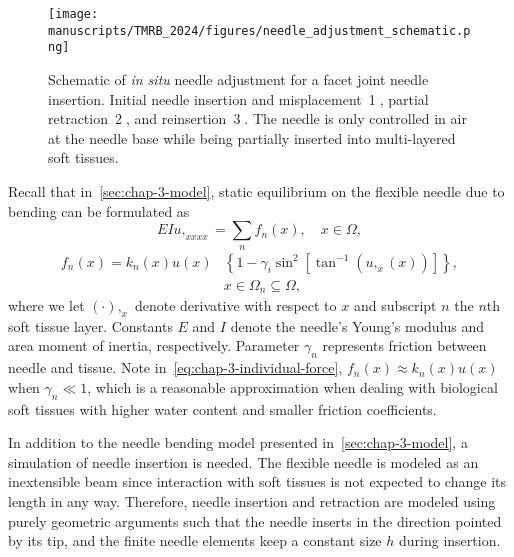\begin{figure}[t]
  \centering
  \texttt{[image: manuscripts/TMRB\_2024/figures/needle\_adjustment\_schematic.png]}
  \caption{Schematic of \textit{in situ} needle adjustment for a facet joint needle insertion. Initial needle insertion and misplacement~\textcircled{1}, partial retraction~\textcircled{2}, and reinsertion~\textcircled{3}. The needle is only controlled in air at the needle base while being partially inserted into multi-layered soft tissues.}
  \label{fig:chap-3-needle-adjustment-schematic}
\end{figure}

Recall that in~\cref{sec:chap-3-model}, static equilibrium on the flexible needle due to bending can be formulated as
\begin{equation}
  EIu,_{xxxx} = \sum_{n}f_n(x), \quad x\in\Omega,
\end{equation}
\begin{equation}
  \begin{aligned}
      \label{eq:chap-3-individual-force}
    f_n(x) = k_n(x)u(x)&\left\{1 - \gamma_i\sin^2\left[ \tan^{-1} \left( u,_x(x) \right) \right] \right\}, \\
    &x \in \Omega_n \subseteq \Omega ,
  \end{aligned}
\end{equation}
where we let $\left( \cdot \right),_x$ denote derivative with respect to $x$ and subscript $n$ the $n$th soft tissue layer. Constants $E$ and $I$ denote the needle's Young's modulus and area moment of inertia, respectively. Parameter $\gamma_n$ represents friction between needle and tissue. Note in~\cref{eq:chap-3-individual-force}, $f_n(x) \approx k_n(x)u(x)$ when $\gamma_n \ll 1$, which is a reasonable approximation when dealing with biological soft tissues with higher water content and smaller friction coefficients.

In addition to the needle bending model presented in~\cref{sec:chap-3-model}, a simulation of needle insertion is needed. The flexible needle is modeled as an inextensible beam since interaction with soft tissues is not expected to change its length in any way. Therefore, needle insertion and retraction are modeled using purely geometric arguments such that the needle inserts in the direction pointed by its tip, and the finite needle elements keep a constant size $h$ during insertion.

